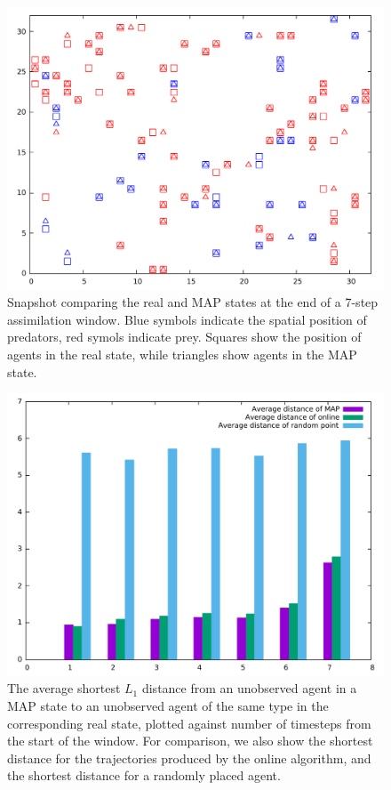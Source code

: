 \documentclass{article}
\begin{document}
\begin{figure}
\begin{center}
\includegraphics[width = 12cm]{snapshot7steps.pdf}
\end{center}
\caption{Snapshot comparing the real and MAP states at the end of a 7-step assimilation window. Blue symbols indicate the spatial position of predators, red symols indicate prey. Squares show the position of agents in the real state, while triangles show agents in the MAP state.}
\label{snapshot}
\end{figure}

\begin{figure}
\begin{center}
\includegraphics[width = 12cm]{distances2.pdf}
\end{center}
\caption{The average shortest $L_1$ distance from an unobserved agent in a MAP state to an unobserved agent of the same type in the corresponding real state, plotted against number of timesteps from the start of the window. For comparison, we also show the shortest distance for the trajectories produced by the online algorithm, and the shortest distance for a randomly placed agent.}
\label{distance}
\end{figure}
\end{document}
